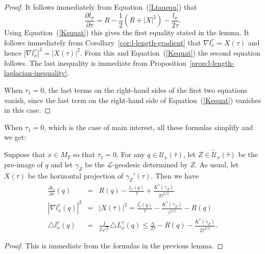 \begin{proof}
 It follows immediately from Equation~(\ref{Ltaueqn}) that
$$\frac{\partial l_x}{\partial \tau}=R-\frac{1}{2}(R+|X|^2)-\frac{l_x}{2\tau}.$$
Using Equation~(\ref{Kequat}) this gives the first equality stated
in the lemma.
 It follows immediately from Corollary~\ref{cor:l-length-gradient} that
$\nabla l_x^\tau=X(\tau)$ and hence $|\nabla
l_x^\tau|^2=|X(\tau)|^2$. From this and Equation~(\ref{Kequat}) the
second equation follows. The last inequality is immediate from
Proposition~\ref{prop:l-length-laplacian-inequality}.

When $\tau_1=0$, the last terms on the right-hand sides of the first
two equations vanish, since the last term on the right-hand side of
Equation~(\ref{Kequat}) vanishes in this case.
\end{proof}

When $\tau_1=0$, which is the case of main interest, all these
formulas simplify and we get:

\begin{theorem}[Reduced length differential identities at $\tau_1=0$]\label{thm:reduced-length-differential-identities}
\label{Ueqn}
Suppose that $x\in M_T$ so that $\tau_1=0$. For any $q\in{\mathcal
U}_x(\bar\tau)$, let $Z\in \widetilde{\mathcal U}_x(\bar\tau)$ be
the pre-image of $q$ and let $\gamma_Z$ be the ${\mathcal
L}$-geodesic determined by $Z$. As usual, let $X(\tau)$ be the
horizontal projection of $\gamma_Z'(\tau)$. Then we have
\begin{eqnarray*} \frac{\partial l_x}{\partial \tau}(q) & = &
R(q)-\frac{l_x(q)}{\bar\tau}+\frac{K^{\bar\tau}(\gamma_Z)}{2\bar\tau^{3/2}}
\\
|\nabla l_x^{\bar\tau}(q)|^2 & = & |X(\bar\tau)|^2  =
\frac{l_x^{\bar\tau}(q)}{\bar\tau}-\frac{K^{\bar\tau}
(\gamma_Z)}{\bar\tau^{3/2}}-R(q)  \\
\triangle l_x^{\bar\tau}(q) & = &
\frac{1}{2\sqrt{\bar\tau}}\triangle L_x^{\bar\tau}(q)\le \frac{n}{2
\bar\tau}-R(q)-\frac{K^{\bar\tau}(\gamma_Z)}{2\bar\tau^{3/2}}.
\end{eqnarray*}
\end{theorem}

\begin{proof}
This is immediate from the formulas in the previous lemma.
\end{proof}

